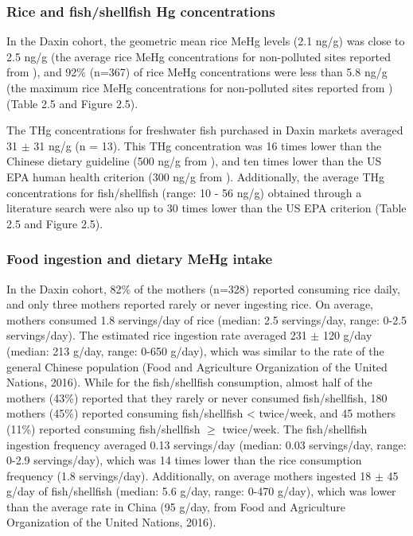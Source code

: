 \subsubsection{Rice and fish/shellfish Hg concentrations}

In the Daxin cohort, the geometric mean rice MeHg levels (2.1 ng/g) was close to 2.5 ng/g (the average rice MeHg concentrations for non-polluted sites reported from \cite{rothenberg2014rice}), and 92\% (n=367) of rice MeHg concentrations were less than 5.8 ng/g (the maximum rice MeHg concentrations for non-polluted sites reported from \cite{rothenberg2014rice}) (Table 2.5 and Figure 2.5).

The THg concentrations for freshwater fish purchased in Daxin markets averaged 31 \({\pm}\) 31 ng/g (n = 13). This THg concentration was 16 times lower than the Chinese dietary guideline (500 ng/g from \cite{usda2014china}), and ten times lower than the US EPA human health criterion (300 ng/g from \cite{usepa2001water}). Additionally, the average THg concentrations for fish/shellfish (range: 10 - 56 ng/g) obtained through a literature search were also up to 30 times lower than the US EPA criterion \citep{usepa2001water} (Table 2.5 and Figure 2.5). 

\subsubsection{Food ingestion and dietary MeHg intake}

In the Daxin cohort, 82\% of the mothers (n=328) reported consuming rice daily, and only three mothers reported rarely or never ingesting rice. On average, mothers consumed 1.8 servings/day of rice (median: 2.5 servings/day, range: 0-2.5 servings/day). The estimated rice ingestion rate averaged 231 \({\pm}\) 120 g/day (median: 213 g/day, range: 0-650 g/day), which was similar to the rate of the general Chinese population (Food and Agriculture Organization of the United Nations, 2016). While for the fish/shellfish consumption, almost half of the mothers (43\%) reported that they rarely or never consumed fish/shellfish, 180 mothers (45\%) reported consuming fish/shellfish < twice/week, and 45 mothers (11\%) reported consuming fish/shellfish ${\ge}$ twice/week. The fish/shellfish ingestion frequency averaged 0.13 servings/day (median: 0.03 servings/day, range: 0-2.9 servings/day), which was 14 times lower than the rice consumption frequency (1.8 servings/day). Additionally, on average mothers ingested 18 \({\pm}\) 45 g/day of fish/shellfish (median: 5.6 g/day, range: 0-470 g/day), which was lower than the average rate in China (95 g/day, from Food and Agriculture Organization of the United Nations, 2016). 

